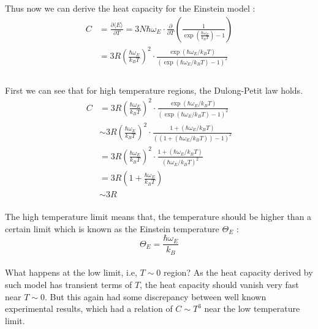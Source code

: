 \documentclass[paper=a4, fontsize=11pt]{scrartcl}
\newcommand{\boltz}{k_B}
\newcommand{\pder}[2]{\frac{\partial #1}{\partial #2}}
\newcommand{\expval}[1]{\langle #1 \rangle}
\begin{document}
Thus now we can derive the heat capacity for the Einstein model :\\

\begin{equation}\nonumber
\begin{split}
	C &= \pder{\expval{E}}{T} = 3N  \hbar \omega_E  \cdot \pder{}{T}\left(  \frac{ 1}{\exp(\frac{\hbar \omega_E}{\boltz T})-1} \right) \\[2.5ex]
	&= 3R \left( \frac{\hbar \omega_E}{\boltz T} \right)^2 \cdot \frac{\exp(\hbar \omega_E /\boltz T)}{(\exp(\hbar \omega_E /\boltz T)-1)^2} \\
\end{split}
\end{equation}\\

First we can see that for high temperature regions, the Dulong-Petit law holds.\\

\begin{equation}\nonumber
\begin{split}
 	C &= 3R \left( \frac{\hbar \omega_E}{\boltz T} \right)^2 \cdot \frac{\exp(\hbar \omega_E /\boltz T)}{(\exp(\hbar \omega_E /\boltz T)-1)^2} \\[2.5ex]
 	&\sim 3R \left( \frac{\hbar \omega_E}{\boltz T} \right)^2 \cdot \frac{1 + (\hbar \omega_E /\boltz T)}{((1 + (\hbar \omega_E /\boltz T))-1)^2}  \\[2.5ex]
 	&= 3R \left( \frac{\hbar \omega_E}{\boltz T} \right)^2 \cdot \frac{1 + (\hbar \omega_E /\boltz T)}{(\hbar \omega_E /\boltz T)^2} \\[2.5ex]
 	&= 3R \left( 1+  \frac{\hbar \omega_E}{\boltz T}\right) \\[2.5ex]
 	&\sim 3R
\end{split}
\end{equation}\\

The high temperature limit means that, the temperature should be higher than a certain limit which is known as the Einstein temperature $\Theta_E$ : \\

\begin{equation}\nonumber
	\Theta_E = \frac{\hbar \omega_E}{\boltz}
\end{equation} \\

What happens at the low limit, i.e, $T\sim 0$ region? As the heat capacity derived by such model has transient terms of $T$, the heat capacity should vanish very fast near $T\sim 0$. But this again had some discrepancy between well known experimental results, which had a relation of $C \sim T^3$ near the low temperature limit. 
\end{document}
